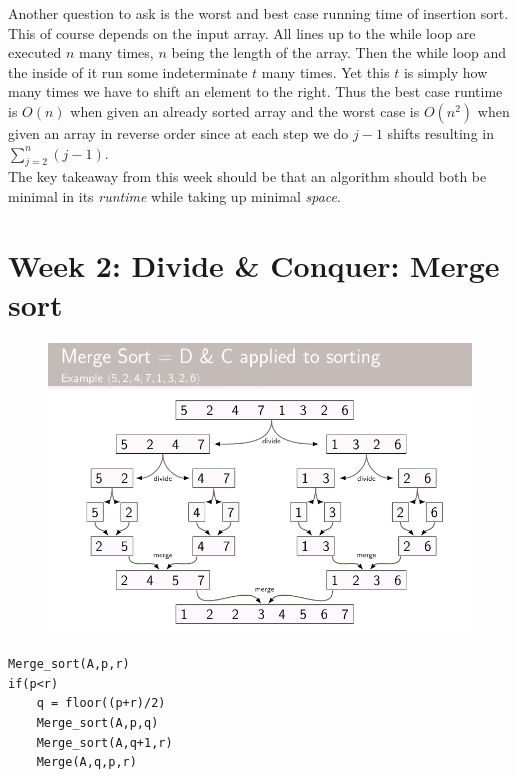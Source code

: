 \documentclass[titlepage]{article}
\numberwithin{equation}{subsection}
\begin{document}
Another question to ask is the worst and best case running time of insertion sort. This of course depends on the input array. All lines up to the while loop are executed $n$ many times, $n$ being the length of the array. Then the while loop and the inside of it run some indeterminate $t$ many times. Yet this $t$ is simply how many times we have to shift an element to the right. Thus the best case runtime is $O(n)$ when given an already sorted array and the worst case is $O(n^{2})$ when given an array in reverse order since at each step we do $j-1$ shifts resulting in $\sum_{j=2}^{n}(j-1)$.
\\

The key takeaway from this week should be that an algorithm should both be minimal in its \textit{runtime} while taking up minimal \textit{space}. 

\clearpage
\section{Week 2: Divide & Conquer: Merge sort}

\begin{figure}[H]
    \centering
    \includegraphics[scale = 0.5]{src/w2.1.png}
    \label{fig:my_label}
\end{figure}

\begin{cs}
\begin{verbatim}
Merge_sort(A,p,r)
if(p<r)
    q = floor((p+r)/2)
    Merge_sort(A,p,q)
    Merge_sort(A,q+1,r)
    Merge(A,q,p,r)
\end{verbatim}

\end{cs}
\end{document}

